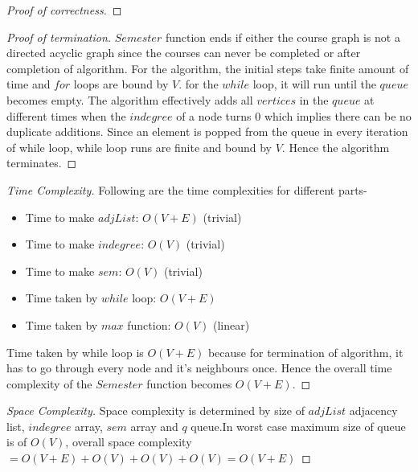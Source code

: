 \begin{solution}{2.2}
\begin{proof}[Proof of correctness]
        
        
        
        
    \end{proof}
    \begin{proof}[Proof of termination]
        $Semester$ function ends if either the course graph is not a directed acyclic graph since the courses can never be completed or after completion of algorithm. For the algorithm, the initial steps take finite amount of time and $for$ loops are bound by $V$. for the $while$ loop, it will run until the $queue$ becomes empty. The algorithm effectively adds all $vertices$ in the $queue$ at different times when the $indegree$ of a node turns 0 which implies there can be no duplicate additions. Since an element is popped from the queue in every iteration of while loop, while loop runs are finite and bound by $V$. Hence the algorithm terminates.
    \end{proof}
    \begin{proof}[Time Complexity]
        Following are the time complexities for different parts-
        \begin{itemize}
            \item Time to make $adjList$: $O(V+E)$ (trivial)
            \item Time to make $indegree$: $O(V)$ (trivial)
            \item Time to make $sem$: $O(V)$ (trivial)
            \item Time taken by $while$ loop: $O(V+E)$ 
            \item Time taken by $max$ function: $O(V)$ (linear)
        \end{itemize}
        Time taken by while loop is $O(V+E)$ because for termination of algorithm, it has to go through every node and it's neighbours once. Hence the overall time complexity of the $Semester$ function becomes $O(V+E)$.
    \end{proof}
    \begin{proof}[Space Complexity]
        Space complexity is determined by size of $adjList$ adjacency list, $indegree$ array, $sem$ array and $q$ queue.In worst case maximum size of queue is of $O(V)$, overall space complexity $=O(V+E)+O(V)+O(V)+O(V)=O(V+E)$
    \end{proof}
\end{solution}
